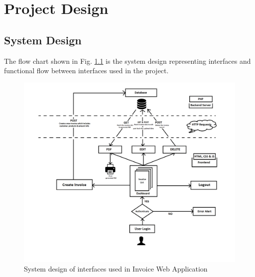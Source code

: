 \chapter{Project Design}
\section{System Design}
The flow chart shown in Fig. \ref{design} is the system design representing interfaces and functional flow between interfaces used in the project.

\begin{figure}[h]\centering
	\includegraphics[width=6.5in]{design.png}
	\caption{System design of interfaces used in Invoice Web Application}\label{design}
\end{figure}
